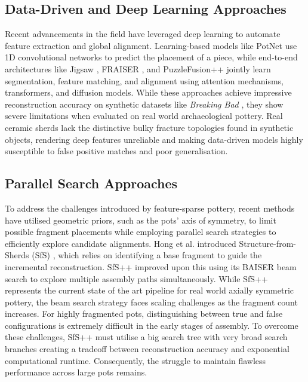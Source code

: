 \documentclass[conference]{IEEEtran}
\begin{document}
\subsection{Data-Driven and Deep Learning Approaches}
Recent advancements in the field have leveraged deep learning to automate feature extraction and global alignment. Learning-based models like PotNet \cite{b9} use 1D convolutional networks to predict the placement of a piece, while end-to-end architectures like Jigsaw \cite{b13}, FRAISER \cite{b14}, and PuzzleFusion++ \cite{b15} jointly learn segmentation, feature matching, and alignment using attention mechanisms, transformers, and diffusion models. While these approaches achieve impressive reconstruction accuracy on synthetic datasets like \textit{Breaking Bad} \cite{b18}, they show severe limitations when evaluated on real world archaeological pottery. Real ceramic sherds lack the distinctive bulky fracture topologies found in synthetic objects, rendering deep features unreliable and making data-driven models highly susceptible to false positive matches and poor generalisation.

\subsection{Parallel Search Approaches}
To address the challenges introduced by feature-sparse pottery, recent methods have utilised geometric priors, such as the pots' axis of symmetry, to limit possible fragment placements while employing parallel search strategies to efficiently explore candidate alignments. Hong et al. introduced Structure-from-Sherds (SfS) \cite{b16}, which relies on identifying a base fragment to guide the incremental reconstruction. SfS++ \cite{b2} improved upon this using its BAISER beam search to explore multiple assembly paths simultaneously. While SfS++ represents the current state of the art pipeline for real world axially symmetric pottery, the beam search strategy faces scaling challenges as the fragment count increases. For highly fragmented pots, distinguishing between true and false configurations is extremely difficult in the early stages of assembly. To overcome these challenges, SfS++ must utilise a big search tree with very broad search branches creating a tradeoff between reconstruction accuracy and exponential computational runtime. Consequently, the struggle to maintain flawless performance across large pots remains.
\end{document}
